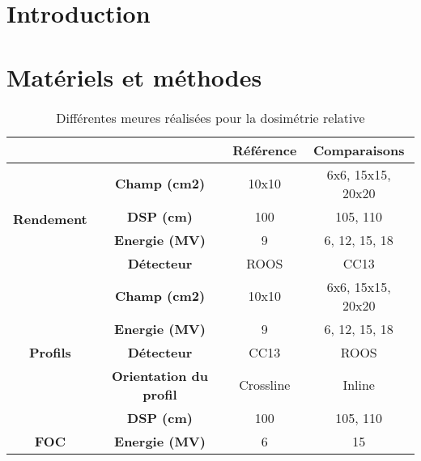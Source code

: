 \documentclass{article}
\begin{document}




\onehalfspacing

\pagestyle{fancy}
	\renewcommand\headrulewidth{0.5pt}
	\renewcommand\footrulewidth{0.5pt}
	\fancyfoot[R]{\thepage}

\tableofcontents
\clearpage
\section{Introduction}

\section{Matériels et méthodes}

\begin{table}[h]
  \centering
  \begin{tabular}{cc|c|c|}
  \cline{3-4}
   &  & \textbf{Référence} & \textbf{Comparaisons} \\ \hline
  \multicolumn{1}{|c|}{\multirow{4}{*}{\textbf{Rendement}}} & \textbf{Champ (cm2)} & 10x10 & 6x6, 15x15, 20x20 \\
  \multicolumn{1}{|c|}{} & \textbf{DSP (cm)} & 100 & 105, 110 \\
  \multicolumn{1}{|c|}{} & \textbf{Energie (MV)} & 9 & 6, 12, 15, 18 \\
  \multicolumn{1}{|c|}{} & \textbf{Détecteur} & ROOS & CC13 \\ \hline
  \multicolumn{1}{|c|}{\multirow{5}{*}{\textbf{Profils}}} & \textbf{Champ (cm2)} & 10x10 & 6x6, 15x15, 20x20 \\
  \multicolumn{1}{|c|}{} & \textbf{Energie (MV)} & 9 & 6, 12, 15, 18 \\
  \multicolumn{1}{|c|}{} & \textbf{Détecteur} & CC13 & ROOS \\
  \multicolumn{1}{|c|}{} & \textbf{Orientation du profil} & Crossline & Inline \\
  \multicolumn{1}{|c|}{} & \textbf{DSP (cm)} & 100 & 105, 110 \\ \hline
  \multicolumn{1}{|c|}{\textbf{FOC}} & \textbf{Energie (MV)} & 6 & 15 \\ \hline
  \end{tabular}
  \caption{Différentes meures réalisées pour la dosimétrie relative}
  \label{table_mesures}
  \end{table}
\end{document}
